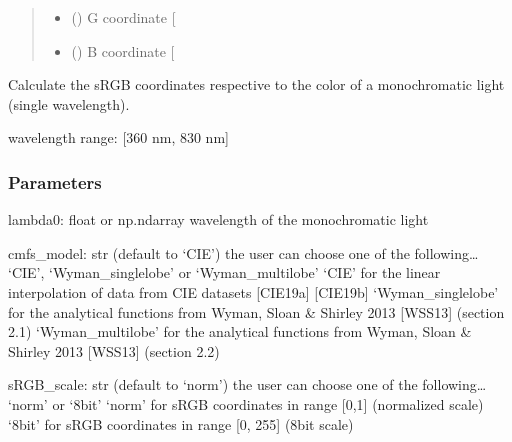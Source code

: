\documentclass[letterpaper,10pt,english]{sphinxmanual}
\begin{document}
\begin{fulllineitems}
\begin{quote}
\begin{description}
\begin{itemize}
\item {} 
\sphinxAtStartPar
{} () \textendash{} G coordinate {[}\sphinxhyphen{}{]}

\item {} 
\sphinxAtStartPar
{} () \textendash{} B coordinate {[}\sphinxhyphen{}{]}

\end{itemize}


\end{description}\end{quote}

\end{fulllineitems}


\begin{fulllineitems}
\label{\detokenize{07_colors:skinoptics.colors.sRGB_from_lambda0}}
\pysigstartsignatures
{}
\pysigstopsignatures
\sphinxAtStartPar
Calculate the sRGB coordinates respective to the color of a monochromatic light (single wavelength).

\sphinxAtStartPar
wavelength range: {[}360 nm, 830 nm{]}


\subsubsection{Parameters}
\label{\detokenize{07_colors:id27}}
\sphinxAtStartPar
lambda0: float or np.ndarray
wavelength of the monochromatic light

\sphinxAtStartPar
cmfs\_model: str (default to ‘CIE’)
the user can choose one of the following… ‘CIE’, ‘Wyman\_singlelobe’ or ‘Wyman\_multilobe’
‘CIE’ for the linear interpolation of data from CIE datasets {[}CIE19a{]} {[}CIE19b{]}
‘Wyman\_singlelobe’ for the analytical functions from Wyman, Sloan \& Shirley 2013 {[}WSS13{]} (section 2.1)
‘Wyman\_multilobe’ for the analytical functions from Wyman, Sloan \& Shirley 2013 {[}WSS13{]} (section 2.2)

\sphinxAtStartPar
sRGB\_scale: str (default to ‘norm’)
the user can choose one of the following… ‘norm’ or ‘8bit’
‘norm’ for sRGB coordinates in range {[}0,1{]} (normalized scale)
‘8bit’ for sRGB coordinates in range {[}0, 255{]} (8\sphinxhyphen{}bit scale)

\end{fulllineitems}
\end{document}
